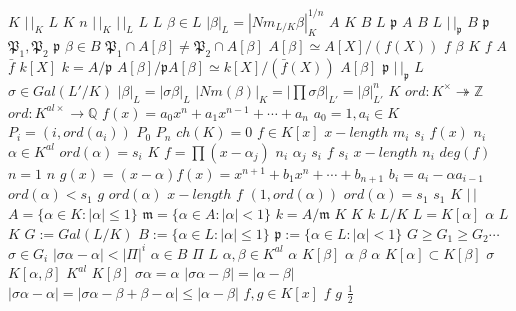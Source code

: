 \documentclass{article}
\begin{document}
$K$
$|\,|_K$
$L$
$K$
$n$
$|\,|_K$
$|\,|_L$
$L$
$L$
$\beta \in L$
$|\beta|_L=|Nm_{L/K} \beta|_K^{1/n}$
$A$
$K$
$B$
$L$
$\mathfrak{p}$
$A$
$B$
$L$
$|\,|_{\mathfrak{p}}$
$B$
$\mathfrak{p}$
$\mathfrak{P}_1,\mathfrak{P}_2$
$\mathfrak{p}$
$\beta \in B$
$\mathfrak{P}_1 \cap A[\beta] \neq \mathfrak{P}_2 \cap A[\beta]$
$A[\beta] \simeq A[X]/(f(X))$
$f$
$\beta$
$K$
$f$
$A$
$\bar{f}$
$k[X]$
$k=A/\mathfrak{p}$
$A[\beta]/\mathfrak{p}A[\beta] \simeq k[X]/(\bar{f}(X))$
$A[\beta]$
$\mathfrak{p}$
$|\,|_{\mathfrak{p}}$
$L$
$\sigma \in Gal(L'/K)$
$|\beta|_L=|\sigma \beta|_L$
$|Nm(\beta)|_K=|\prod \sigma\beta|_{L'}=|\beta|_{L'}^n$
$K$
$ord:K^{\times}  \twoheadrightarrow \mathbb{Z}$
$ord:K^{al\times} \rightarrow \mathbb{Q}$
$f(x)=a_0x^n+a_1x^{n-1}+ \cdots + a_n$
$a_0=1,a_i \in K$
$P_i=(i,ord(a_i))$
$P_0$
$P_n$
$ch(K)=0$
$f\in K[x]$
$x-length$
$m_i$
$s_i$
$f(x)$
$n_i$
$\alpha \in K^{al}$
$ord(\alpha)=s_i$
$K$
$f=\prod(x-\alpha_j)$
$n_i$
$\alpha_j$
$s_i$
$f$
$s_i$
$x-length$
$n_i$
$deg(f)$
$n=1$
$n$
$g(x)=(x-\alpha)f(x)=x^{n+1}+b_1x^n+\cdots+b_{n+1}$
$b_i=a_i-\alpha a_{i-1}$
$ord(\alpha)<s_1$
$g$
$ord(\alpha)$
$x-length$
$f$
$(1,ord(\alpha))$
$ord(\alpha)=s_1$
$s_1$
$K$
$|\,|$
$A=\{\alpha\in K:|\alpha|\leq1\}$
$\mathfrak{m}=\{\alpha\in A:|\alpha|<1\}$
$k=A/\mathfrak{m}$
$K$
$K$
$k$
$L/K$
$L=K[\alpha]$
$\alpha$
$L$
$K$
$G:=Gal(L/K)$
$B:=\{\alpha\in L : |\alpha|\leq1\}$
$\mathfrak{p}:=\{\alpha\in L:|\alpha|<1\}$
$G \geq G_1 \geq G_2 \cdots$
$\sigma\in G_i$
$|\sigma\alpha-\alpha|<|\Pi|^i$
$\alpha\in B$
$\Pi$
$L$
$\alpha,\beta\in K^{al}$
$\alpha$
$K[\beta]$
$\alpha$
$\beta$
$\alpha$
$K[\alpha]\subset K[\beta]$
$\sigma$
$K[\alpha,\beta]$
$K^{al}$
$K[\beta]$
$\sigma\alpha=\alpha$
$|\sigma\alpha-\beta|=|\alpha-\beta|$
$|\sigma\alpha-\alpha|=|\sigma\alpha-\beta+\beta-\alpha|\leq|\alpha-\beta|$
$f,g\in K[x]$
$f$
$g$
$\frac{1}{2}$
\end{document}
